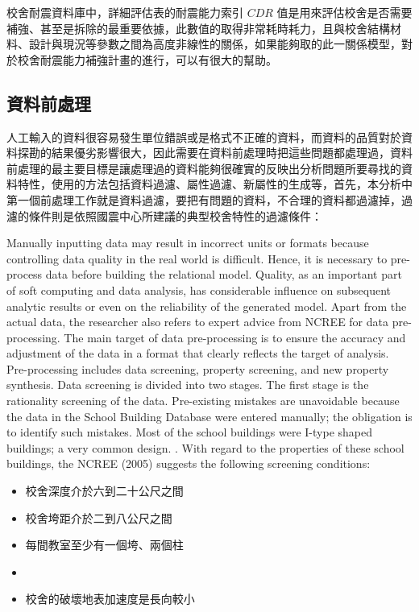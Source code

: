 校舍耐震資料庫中，詳細評估表的耐震能力索引 $CDR$ 值是用來評估校舍是否需要補強、甚至是拆除的最重要依據，此數值的取得非常耗時耗力，且與校舍結構材料、設計與現況等參數之間為高度非線性的關係，如果能夠取的此一關係模型，對於校舍耐震能力補強計畫的進行，可以有很大的幫助。

\subsection{資料前處理}

人工輸入的資料很容易發生單位錯誤或是格式不正確的資料，而資料的品質對於資料探勘的結果優劣影響很大，因此需要在資料前處理時把這些問題都處理過，資料前處理的最主要目標是讓處理過的資料能夠很確實的反映出分析問題所要尋找的資料特性，使用的方法包括資料過濾、屬性過濾、新屬性的生成等，首先，本分析中第一個前處理工作就是資料過濾，要把有問題的資料，不合理的資料都過濾掉，過濾的條件則是依照國震中心所建議的典型校舍特性的過濾條件：

Manually inputting data may result in incorrect units or formats because controlling data quality in the real world is difficult. Hence, it is necessary to pre-process data before building the relational model. Quality, as an important part of soft computing and data analysis, has considerable influence on subsequent analytic results or even on the reliability of the generated model. Apart from the actual data, the researcher also refers to expert advice from NCREE for data pre-processing. The main target of data pre-processing is to ensure the accuracy and adjustment of the data in a format that clearly reflects the target of analysis. Pre-processing includes data screening, property screening, and new property synthesis. Data screening is divided into two stages. The first stage is the rationality screening of the data. Pre-existing mistakes are unavoidable because the data in the School Building Database were entered manually; the obligation is to identify such mistakes. Most of the school buildings were I-type shaped buildings; a very common design. . With regard to the properties of these school buildings, the NCREE (2005) suggests the following screening conditions:

\begin{itemize}
\item 校舍深度介於六到二十公尺之間
\item 校舍垮距介於二到八公尺之間
\item 每間教室至少有一個垮、兩個柱
\item 
\item 校舍的破壞地表加速度是長向較小
\end{itemize}



